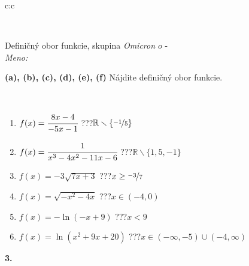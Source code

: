 \documentclass[10pt]{report}
\newcommand\omicron{o}
\begin{document}
\begin{tabular}{c:c}
\begin{minipage}[c][104.5mm][t]{0.5\linewidth}
\begin{center}
\begin{minipage}{0.20\linewidth}
\begin{center}
\end{center}
\end{minipage}
\end{center}
\end{minipage}
\\ \hdashline
\begin{minipage}[c][104.5mm][t]{0.5\linewidth}
\begin{center}
\vspace{7mm}
{\huge Definičný obor funkcie, skupina \textit{Omicron $\omicron$} -}\\[5mm]
\textit{Meno:}\phantom{xxxxxxxxxxxxxxxxxxxxxxxxxxxxxxxxxxxxxxxxxxxxxxxxxxxxxxxxxxxxxxxxx}\\[5mm]
\begin{minipage}{0.95\linewidth}
\begin{center}
{
\textbf{(a), (b), (c), (d), (e), (f)} Nájdite definičný obor funkcie. \\[1mm]
\phantom{x}
}
\end{center}
\end{minipage}
\\[4mm]
\begin{minipage}{0.79\linewidth}
\begin{center}
\begin{varwidth}{\linewidth}
\begin{enumerate}
\normalsizerrr
\item $f(x)=\cfrac{8x-4}{-5x-1}$\quad \dotfill\; ???\;\dotfill \quad $ \mathbb{R} \smallsetminus\{\nicefrac{-1}{5} \}$
\item $f(x)=\cfrac{1}{x^3-4x^2-11x-6}$\quad \dotfill\; ???\;\dotfill \quad $ \mathbb{R} \smallsetminus\{1,5,-1 \}$
\item $f(x)=-3\sqrt{7x+3}$\quad \dotfill\; ???\;\dotfill \quad $x\geq\nicefrac{-3}{7}$
\item $f(x)=\sqrt{-x^2-4x}$\quad \dotfill\; ???\;\dotfill \quad $x\in(-4 , 0)$
\item $f(x)=-\ln{(-x+9)}$\quad \dotfill\; ???\;\dotfill \quad $x<9$
\item $f(x)=\ln{(x^2+9x+20)}$\quad \dotfill\; ???\;\dotfill \quad $x\in(-\infty , -5)\cup(-4 , \infty)$
\end{enumerate}
\end{varwidth}
\end{center}
\end{minipage}
\begin{minipage}{0.20\linewidth}
\begin{center}
{\Huge\bfseries 3.} \\[2mm]

\end{center}
\end{minipage}
\end{center}
\end{minipage}
\end{tabular}
\end{document}
